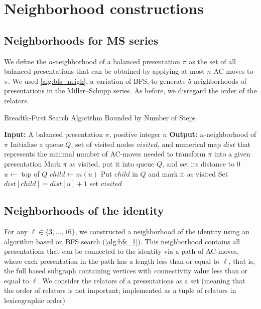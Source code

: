 
\section{Neighborhood constructions}\label{s:neighborhoods}

\subsection{Neighborhoods for MS series}

We define the $n$-neighborhood of a balanced presentation $\pi$ as the set of all balanced presentations that can be obtained by applying at most $n$ AC-moves to $\pi$.
We used \cref{alg:bfs_neigh}, a variation of BFS, to generate $5$-neighborhoods of presentations in the Miller--Schupp series. 
As before, we disregard the order of the relators.

\begin{algorithm}
	\caption{Breadth-First Search Algorithm Bounded by Number of Steps}\label{alg:bfs_neigh}
	\begin{algorithmic}[1]
		\State \textbf{Input:} A balanced presentation $\pi$, positive integer $n$
		\State \textbf{Output:} $n$-neighborhood of $\pi$
		\State Initialize a queue $Q$, set of visited nodes $visited$, and numerical map $dist$ that represents the minimal number of AC-moves needed to transform $\pi$ into a given presentation
		\State Mark $\pi$ as visited, put it into queue $Q$, and set its distance to $0$
		\State $u \gets $ top of $Q$ 
		\State $child \gets m(u)$
		\State Put $child$ in $Q$ and mark it as visited
		\State Set $dist[child] = dist[u] + 1$
		\EndIf
		\EndFor
		\EndWhile
		\Return set $visited$
	\end{algorithmic}
\end{algorithm}

\subsection{Neighborhoods of the identity}

For any $\ell \in \{3, \dots, 16\}$, we constructed a neighborhood of the identity using an algorithm based on BFS search (\cref{alg:bfs_1}).
This neighborhood contains all presentations that can be connected to the identity via a path of AC-moves, where each presentation in the path has a length less than or equal to $\ell$, that is, the full based subgraph containing vertices with connectivity value less than or equal to $\ell$.
We consider the relators of a presentations as a set (meaning that the order of relators is not important; implemented as a tuple of relators in lexicographic order) 

